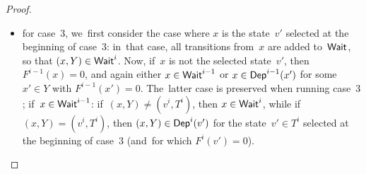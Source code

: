 \begin{proof}
\begin{itemize}
  \item for case~$3$, we~first consider the case where $x$ is the
    state~$v'$ selected at the beginning of case~$3$: in~that case,
    all transitions from~$x$ are added to~$\textsf{Wait}$, so that
    $(x,Y)\in\textsf{Wait}^i$. Now, if~$x$ is not the selected state~$v'$,
    then $F^{i-1}(x)=0$, and again either $x\in\textsf{Wait}^{i-1}$ or
    $x\in\textsf{Dep}^{i-1}(x')$ for some~$x'\in Y$ with
    $F^{i-1}(x')=0$. The~latter case is preserved when running
    case~$3$; if~$x\in\textsf{Wait}^{i-1}$: if~$(x,Y)\not=(v^i,T^i)$, then
    $x\in\textsf{Wait}^i$, while if~$(x,Y)=(v^i,T^i)$, then
    $(x,Y)\in\textsf{Dep}^i(v')$ for the state~$v'\in T^i$ selected at the
    beginning of case~$3$ (and~for which $F^i(v')=0$).
  \end{itemize}
%  
%
%
\end{proof}

